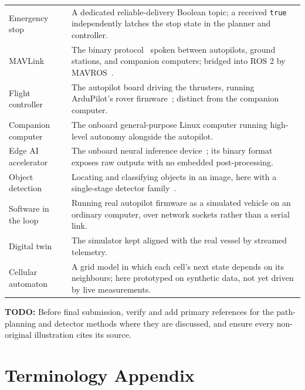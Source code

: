 \documentclass[a4paper,12pt,oneside,openany]{report}
\newcommand{\ReportTodo}[1]{\textbf{TODO:} #1}
\begin{document}
\begin{longtable}{@{}L{0.25\textwidth}L{0.67\textwidth}@{}}
  Emergency stop & A dedicated reliable-delivery Boolean topic; a received \texttt{true}
    independently latches the stop state in the planner and controller. \\
  MAVLink & The binary protocol~\cite{mavlink} spoken between autopilots, ground stations, and
    companion computers; bridged into ROS 2 by MAVROS~\cite{mavros}. \\
  Flight controller & The autopilot board driving the thrusters, running ArduPilot's rover
    firmware~\cite{ardupilot}; distinct from the companion computer. \\
  Companion computer & The onboard general-purpose Linux computer running high-level autonomy
    alongside the autopilot. \\
  Edge AI accelerator & The onboard neural inference device~\cite{hailo}; its binary format exposes
    raw outputs with no embedded post-processing. \\
  Object detection & Locating and classifying objects in an image, here with a single-stage
    detector family~\cite{ultralytics}. \\
  Software in the loop & Running real autopilot firmware as a simulated vehicle on an ordinary
    computer, over network sockets rather than a serial link. \\
  Digital twin & The simulator kept aligned with the real vessel by streamed telemetry. \\
  Cellular automaton & A grid model in which each cell's next state depends on its neighbours;
    here prototyped on synthetic data, not yet driven by live measurements. \\
  \bottomrule
\end{longtable}

\begingroup
\raggedright


\endgroup

\ReportTodo{Before final submission, verify and add primary references for the path-planning and
detector methods where they are discussed, and ensure every non-original illustration cites its
source.}

\appendix

\chapter{Terminology Appendix}
\label{app:terminology}
\end{document}
